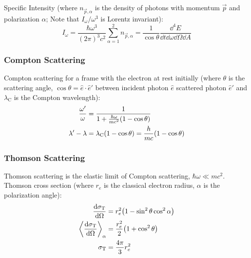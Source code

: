 		\noindent
		Specific Intensity (where $n_{\vec{p},\alpha}$ is the density of photons with momentum $\vec{p}$ and polarization $\alpha$; Note that $I_\omega / \omega^3$ is Lorentz invariant):
		\begin{equation}
			I_\omega = \frac{\hbar \omega^3}{(2 \pi)^3 c^2} \sum_{\alpha=1}^{2} n_{\vec{p},\alpha} = \frac{1}{\cos \theta} \frac{\dd^4 E}{\dd t \dd\omega \dd \Omega \dd A}
		\end{equation}

		\subsubsection{Compton Scattering}
			Compton scattering for a frame with the electron at rest initially (where $\theta$ is the scattering angle, $\cos\theta = \hat{e}\cdot\hat{e}'$ between incident photon $\hat{e}$ scattered photon $\hat{e}'$ and $\lambda_{\mathrm{C}}$ is the Compton wavelength):
			\begin{equation}
				\begin{aligned}
					\frac{\omega'}{\omega} &= \frac{1}{1+\frac{\hbar\omega}{mc^2}\qty(1-\cos\theta)} \\
					\lambda' - \lambda &= \lambda_\mathrm{C}(1-\cos\theta) = \frac{h}{m c}(1-\cos\theta)
				\end{aligned}
			\end{equation}

		\subsubsection{Thomson Scattering}
			Thomson scattering is the elastic limit of Compton scattering, \ie $\hbar\omega \ll mc^2$.
			Thomson cross section (where $r_e$ is the classical electron radius, $\alpha$ is the polarization angle):
			\begin{equation}
				\begin{aligned}
					\dv{\sigma_\text{T}}{\Omega} &= r_e^2 \qty(1-\sin^2 \theta \cos^2 \alpha) \\
					\left\langle \dv{\sigma_\text{T}}{\Omega} \right\rangle_{\alpha} &= \frac{r_e^2}{2} \qty(1+\cos^2 \theta) \\
					\sigma_\text{T} &= \frac{4\pi}{3}r_e^2 \\
				\end{aligned}
			\end{equation}

